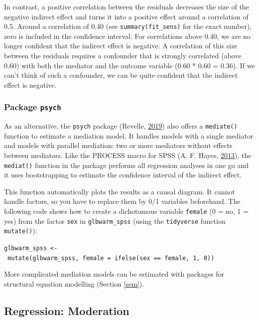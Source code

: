 \documentclass[doc,floatsintext]{apa6}
\begin{document}
In contrast, a positive correlation between the residuals decreases the
size of the negative indirect effect and turns it into a positive effect
around a correlation of 0.5. Around a correlation of 0.40 (see
\texttt{summary(fit\_sens)} for the exact number), zero is included in
the confidence interval. For correlations above 0.40, we are no longer
confident that the indirect effect is negative. A correlation of this
size between the residuals requires a confounder that is strongly
correlated (above 0.60) with both the mediator and the outcome variable
(0.60 * 0.60 = 0.36). If we can't think of such a confounder, we can be
quite confident that the indirect effect is negative.

\subsubsection{\texorpdfstring{Package
\texttt{psych}}{Package psych}}\label{package-psych}

As an alternative, the \texttt{psych} package (Revelle,
\protect\hyperlink{ref-R-psych}{2019}) also offers a \texttt{mediate()}
function to estimate a mediation model. It handles models with a single
mediator and models with parallel mediation: two or more mediators
without effects between mediators. Like the PROCESS macro for SPSS (A.
F. Hayes,
\protect\hyperlink{ref-HayesIntroductionMediationModeration2013}{2013}),
the \texttt{mediat()} function in the package performs all regression
analyses in one go and it uses bootstrapping to estimate the confidence
interval of the indirect effect.

This function automatically plots the results as a causal diagram. It
cannot handle factors, so you have to replace them by 0/1 variables
beforehand. The following code shows how to create a dichotomous
variable \texttt{female} (0 = no, 1 = yes) from the factor \texttt{sex}
in \texttt{glbwarm\_spss} (using the \texttt{tidyverse} function
\texttt{mutate()}):

\texttt{glbwarm\_spss\ \textless{}-\ mutate(glbwarm\_spss,\ female\ =\ ifelse(sex\ ==\ \textquotesingle{}female\textquotesingle{},\ 1,\ 0))}

More complicated mediation models can be estimated with packages for
structural equation modelling (Section \ref{sem}).

\subsection{Regression: Moderation}\label{regression-moderation}
\end{document}
